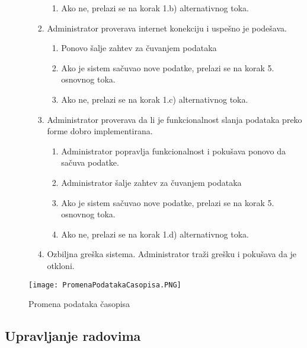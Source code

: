 \documentclass[a4paper]{article}
\begin{document}
\begin{itemize}
\begin{enumerate}
\begin{enumerate}
\begin{enumerate}
                        \item Ako ne, prelazi se na korak 1.b) alternativnog toka.
                    \end{enumerate}
                    \item Administrator proverava internet konekciju i uspešno je podešava.
                    \begin{enumerate}
                        \item Ponovo šalje zahtev za čuvanjem podataka
                        \item Ako je sistem sačuvao nove podatke, prelazi se na korak 5. osnovnog toka.
                        \item Ako ne, prelazi se na korak 1.c) alternativnog toka.
                    \end{enumerate}
                    \item Administrator proverava da li je funkcionalnost slanja podataka preko forme dobro implementirana.
                    \begin{enumerate}
                        \item Administrator popravlja funkcionalnost i pokušava ponovo da sačuva podatke.
                        \item Administrator šalje zahtev za čuvanjem podataka
                        \item Ako je sistem sačuvao nove podatke, prelazi se na korak 5. osnovnog toka.
                        \item Ako ne, prelazi se na korak 1.d) alternativnog toka.
                    \end{enumerate}
                    \item Ozbiljna greška sistema. Administrator traži grešku i pokušava da je otkloni.
                \end{enumerate}
        \end{enumerate}
\end{itemize}

\begin{figure}[hbt!]
    \centering
    \texttt{[image: PromenaPodatakaCasopisa.PNG]}
    \caption{Promena podataka časopisa}
    \label{fig:my_label}
\end{figure}

\subsection{Upravljanje radovima}
\end{document}
